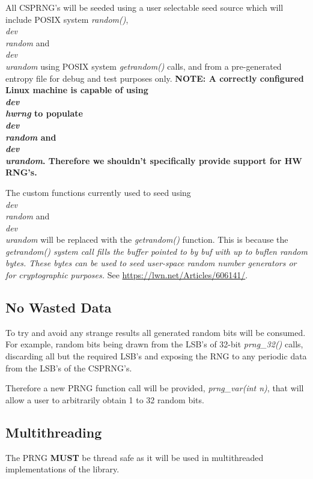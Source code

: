 All CSPRNG's will be seeded using a user selectable seed source which will include POSIX system \textit{random()}, \textit{\\dev\\random} and \textit{\\dev\\urandom} using POSIX system \textit{getrandom()} calls, and from a pre-generated entropy file for debug and test purposes only. \textbf{NOTE: A correctly configured Linux machine is capable of using \textit{\\dev\\hwrng} to populate \textit{\\dev\\random} and \textit{\\dev\\urandom}. Therefore we shouldn't specifically provide support for HW RNG's.}

The custom functions currently used to seed using \textit{\\dev\\random} and \textit{\\dev\\urandom} will be replaced with the \textit{getrandom()} function. This is because the \textit{getrandom() system call fills the buffer pointed to by buf with up to buflen random bytes.  These bytes can be used to seed user-space random number generators or for cryptographic purposes.} See \url{https://lwn.net/Articles/606141/}.

\subsection{No Wasted Data}

To try and avoid any strange results all generated random bits will be consumed. For example, random bits being drawn from the LSB's of 32-bit \textit{prng\_32()} calls, discarding all but the required LSB's and exposing the RNG to any periodic data from the LSB's of the CSPRNG's.

Therefore a new PRNG function call will be provided, \textit{prng\_var(int n)}, that will allow a user to arbitrarily obtain 1 to 32 random bits.

\subsection{Multithreading}

The PRNG \textbf{MUST} be thread safe as it will be used in multithreaded implementations of the library.


